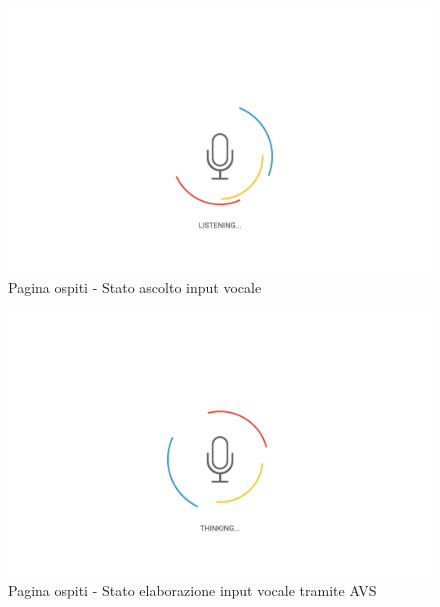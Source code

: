 \documentclass[../ManualeUtente_v1.0.0.tex]{subfiles}
\begin{document}
		\begin{figure}[!h]
			\centering
		 	\includegraphics[width=\textwidth]{Screenshot/guest-listening.png}
			\caption{Pagina ospiti - Stato ascolto input vocale}
			\label{fig:label}
		\end{figure}
		
		\begin{figure}[!h]
			\centering
		 	\includegraphics[width=\textwidth]{Screenshot/guest-thinking.png}
			\caption{Pagina ospiti - Stato elaborazione input vocale tramite AVS}
			\label{fig:label}
		\end{figure}
\end{document}
